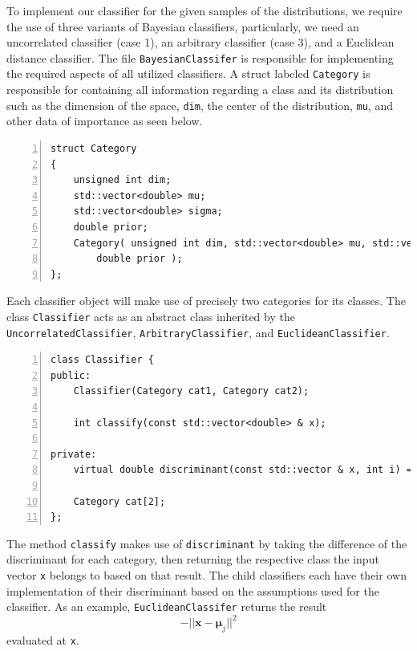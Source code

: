 \documentclass[ 12pt ]{article}
\begin{document}
To implement our classifier for the given samples of the distributions, we require the use of three variants of Bayesian classifiers, particularly, we need an uncorrelated classifier
(case 1), an arbitrary classifier (case 3), and a Euclidean distance classifier. The file \verb|BayesianClassifer| is responsible for implementing the required aspects of all utilized
classifiers. A struct labeled \verb|Category| is responsible for containing all information regarding a class and its distribution such as the dimension of the space, \verb|dim|, the
center of the distribution, \verb|mu|, and other data of importance as seen below.
\begin{lstlisting}[basicstyle=\ttfamily\footnotesize, numbers=left, tabsize=4, frame=single]
struct Category
{
    unsigned int dim;
    std::vector<double> mu;
    std::vector<double> sigma;
    double prior;
    Category( unsigned int dim, std::vector<double> mu, std::vector<double> sigma,
        double prior );
};
\end{lstlisting}
Each classifier object will make use of precisely two categories for its classes. The class \verb|Classifier| acts as an abstract class inherited by the \verb|UncorrelatedClassifier|,
\verb|ArbitraryClassifier|, and \verb|EuclideanClassifier|.
\begin{lstlisting}[basicstyle=\ttfamily\footnotesize, numbers=left, tabsize=4, frame=single]
class Classifier {
public:
    Classifier(Category cat1, Category cat2);

    int classify(const std::vector<double> & x);

private:
    virtual double discriminant(const std::vector & x, int i) = 0;

    Category cat[2];
};
\end{lstlisting}
The method \verb|classify| makes use of \verb|discriminant| by taking the difference of the discriminant for each category, then returning the respective class the input vector \verb|x|
belongs to based on that result. The child classifiers each have their own implementation of their discriminant based on the assumptions used for the classifier. As an example,
\verb|EuclideanClassifer| returns the result $$-||\textbf{x} - \mathbf{\mu}_j||^2$$ evaluated at \verb|x|.
\end{document}
